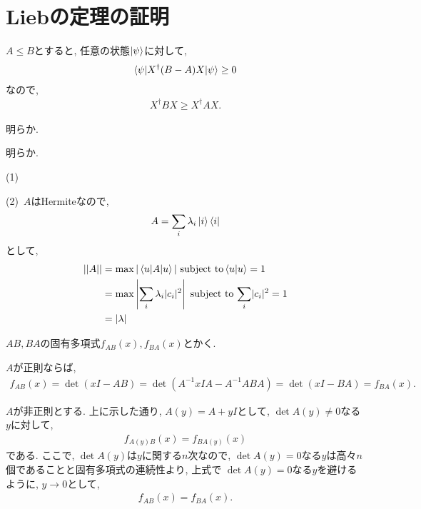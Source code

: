 \renewcommand\thechapter{\Alph{chapter}}
\setcounter{chapter}{5}
\chapter{Liebの定理の証明}

\begin{ex}
    \label{exf.1}
    $A \le B$とすると, 任意の状態$\ket{\psi}$に対して,
    \begin{align*}
        \braket{ \psi | X^\dagger (B - A) X | \psi} \ge 0
    \end{align*}
    なので,
    \begin{align*}
        X^\dagger B X \ge X^\dagger A X.
    \end{align*}
\end{ex}

\begin{ex}
    \label{exf.2}
    明らか.
\end{ex}

\begin{ex}
    \label{exf.3}
    明らか.
\end{ex}

\begin{ex}
    \label{exf.4}
    (1) \par
    (2)\
    $A$はHermiteなので,
    \begin{align*}
        A = \sum_i \lambda_i \ket{i} \bra{i}
    \end{align*}
    として,
    \begin{align*}
        || A ||
         & = \max | \braket{u | A | u} | \ \mathrm{subject \ to } \braket{u|u} = 1                      \\
         & = \max \left|\sum_i \lambda_i |c_i|^2 \right| \ \mathrm{subject \ to \ } {\sum_i}|c_i|^2 = 1 \\
         & = | \lambda |
    \end{align*}
\end{ex}

\begin{ex}
    \label{exf.5}
    $AB, BA$の固有多項式$f_{AB}(x), f_{BA}(x)$とかく.
    \par
    $A$が正則ならば,
    \begin{align*}
        f_{AB}(x) =
        \det\left( xI - AB\right)
        = \det\left( A^{-1} x I A - A^{-1} ABA\right)
        = \det\left( xI - BA \right)
        = f_{BA}(x).
    \end{align*}
    \par
    $A$が非正則とする.
    上に示した通り, $A(y) = A + yI$として, $\det A(y) \neq 0$なる$y$に対して,
    \begin{align*}
        f_{A(y)B}(x) = f_{BA(y)}(x)
    \end{align*}
    である. ここで,
    $\det A(y)$は$y$に関する$n$次なので, $\det A(y) = 0$なる$y$は高々$n$個であることと固有多項式の連続性より,
    上式で $\det A(y) = 0$なる$y$を避けるように, $y \to 0$として,
    \begin{align*}
        f_{AB}(x) = f_{BA}(x).
    \end{align*}
\end{ex}

